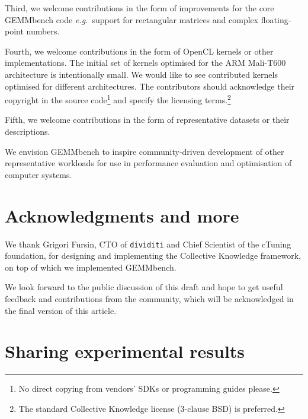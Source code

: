 \documentclass{acm_proc_article-sp} %
\begin{document}
Third, we welcome contributions in the form of improvements for the core
GEMMbench code {\em e.g.}\ support for rectangular matrices and complex
floating-point numbers.

Fourth, we welcome contributions in the form of OpenCL kernels or other
implementations.
%
The initial set of kernels optimised for the ARM Mali-T600 architecture is
intentionally small.
%
We would like to see contributed kernels optimised for different architectures.
%
The contributors should acknowledge their copyright in the source
code\footnote{No direct copying from vendors' SDKs or programming guides
please.} and specify the licensing terms.\footnote{The standard Collective
Knowledge license (3-clause BSD) is preferred.}
%

Fifth, we welcome contributions in the form of representative datasets or
their descriptions.

We envision GEMMbench to inspire community-driven development of other
representative workloads for use in performance evaluation and optimisation of
computer systems.

\section{Acknowledgments and more}

We thank Grigori Fursin, CTO of {\tt dividiti} and Chief Scientist of the
cTuning foundation, for designing and implementing the Collective
Knowledge framework, on top of which we implemented GEMMbench.

We look forward to the public discussion of this draft and hope to get useful
feedback and contributions from the community, which will be acknowledged in
the final version of this article.





\appendix

\section{Sharing experimental results}
\end{document}
